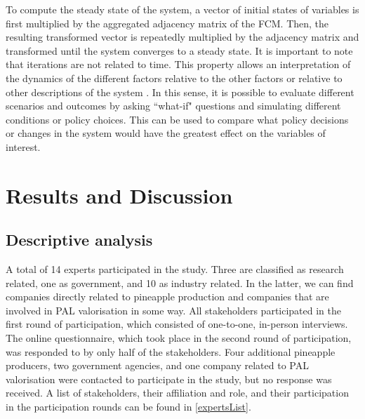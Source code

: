 To compute the steady state of the system, a vector of initial states of variables is first multiplied by the aggregated adjacency matrix of the FCM. Then, the resulting transformed vector is repeatedly multiplied by the adjacency matrix and transformed until the system converges to a steady state.  It is important to note that iterations are not related to time. This property allows an interpretation of the dynamics of the different factors relative to the other factors or relative to other descriptions of the system \citep{edwards2021building, diniz2015mapping}. In this sense, it is possible to evaluate different scenarios and outcomes by asking ``what-if" questions and simulating different conditions or policy choices. This can be used to compare what policy decisions or changes in the system would have the greatest effect on the variables of interest.

\section{Results and Discussion}

\subsection{Descriptive analysis}
\label{descriptiveFCM}

A total of 14 experts participated in the study. Three are classified as research related, one as government, and 10 as industry related. In the latter, we can find companies directly related to pineapple production and companies that are involved in PAL valorisation in some way. All stakeholders participated in the first round of participation, which consisted of one-to-one, in-person interviews. The online questionnaire, which took place in the second round of participation, was responded to by only half of the stakeholders. Four additional pineapple producers, two government agencies, and one company related to PAL valorisation were contacted to participate in the study, but no response was received. A list of stakeholders, their affiliation and role, and their participation in the participation rounds can be found in \cref{expertsList}.

